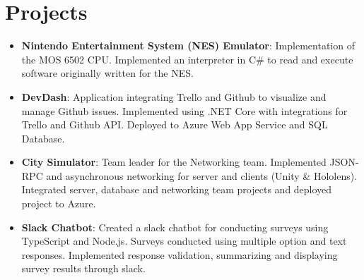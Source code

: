 \documentclass[letterpaper,11pt]{article}
\newcommand{\resumeItem}[2]{
  \item\small{
    \textbf{#1}{: #2 \vspace{-2pt}}
  }
}
\newcommand{\resumeSubItem}[2]{\resumeItem{#1}{#2}\vspace{-4pt}}
\newcommand{\resumeSubHeadingListStart}{\begin{itemize}[leftmargin=*]}
\newcommand{\resumeSubHeadingListEnd}{\end{itemize}}
\begin{document}
\section{Projects}
  \resumeSubHeadingListStart
    \resumeSubItem{Nintendo Entertainment System (NES) Emulator}
      {Implementation of the MOS 6502 CPU. Implemented an interpreter in C\# to read and execute software originally written for the NES.}
    \resumeSubItem{DevDash}
      {Application integrating Trello and Github to visualize and manage Github issues. Implemented using .NET Core with integrations for Trello and Github API. Deployed to Azure Web App Service and SQL Database.}
    \resumeSubItem{City Simulator}
      {Team leader for the Networking team. Implemented JSON-RPC and asynchronous networking for server and clients (Unity \& Hololens). Integrated server, database and networking team projects and deployed project to Azure.}
    \resumeSubItem{Slack Chatbot}
      {Created a slack chatbot for conducting surveys using TypeScript and Node.js. Surveys conducted using multiple option and text responses. Implemented response validation, summarizing and displaying survey results through slack.}
  \resumeSubHeadingListEnd

\end{document}
